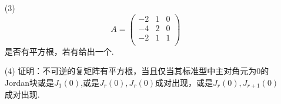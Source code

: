 \begin{itemize}
\begin{itemize}
        \vspace{3cm}
        \item[(3)]
        \begin{equation}
        \nonumber
            A = 
            \begin{pmatrix}
               -2& 1& 0\\
               -4& 2& 0\\
               -2& 1& 1\\
            \end{pmatrix}
        \end{equation} 
        是否有平方根，若有给出一个.
        \vspace{3cm}
        \item[(4)] 证明：不可逆的复矩阵有平方根，当且仅当其标准型中主对角元为0的
        Jordan块或是$J_1(0)$,或是$J_r(0), J_{r}(0)$成对出现，或是$J_r(0), J_{r+1}(0)$成对出现. 
        \vspace{3cm}
    \end{itemize}
\end{itemize}
